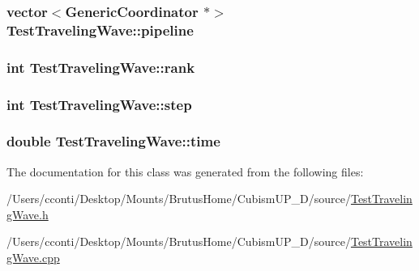 \subsubsection[{pipeline}]{\setlength{\rightskip}{0pt plus 5cm}vector$<${\bf Generic\+Coordinator} $\ast$$>$ Test\+Traveling\+Wave\+::pipeline\hspace{0.3cm}{\ttfamily [protected]}}\label{class_test_traveling_wave_a2bc69ad5f58d7c812ba12763d084e5e8}
\hypertarget{class_test_traveling_wave_a069c3d638156a0873797cdd07580e39a}{}
\subsubsection[{rank}]{\setlength{\rightskip}{0pt plus 5cm}int Test\+Traveling\+Wave\+::rank\hspace{0.3cm}{\ttfamily [protected]}}\label{class_test_traveling_wave_a069c3d638156a0873797cdd07580e39a}
\hypertarget{class_test_traveling_wave_ae91c33ae668592277f237a680d837dce}{}
\subsubsection[{step}]{\setlength{\rightskip}{0pt plus 5cm}int Test\+Traveling\+Wave\+::step\hspace{0.3cm}{\ttfamily [protected]}}\label{class_test_traveling_wave_ae91c33ae668592277f237a680d837dce}
\hypertarget{class_test_traveling_wave_ad7688dbdad3bc045057f63600965cd95}{}
\subsubsection[{time}]{\setlength{\rightskip}{0pt plus 5cm}double Test\+Traveling\+Wave\+::time\hspace{0.3cm}{\ttfamily [protected]}}\label{class_test_traveling_wave_ad7688dbdad3bc045057f63600965cd95}


The documentation for this class was generated from the following files\+:\begin{DoxyCompactItemize}
\item 
/\+Users/cconti/\+Desktop/\+Mounts/\+Brutus\+Home/\+Cubism\+U\+P\+\_\+D/source/\hyperlink{_test_traveling_wave_8h}{Test\+Traveling\+Wave.\+h}\item 
/\+Users/cconti/\+Desktop/\+Mounts/\+Brutus\+Home/\+Cubism\+U\+P\+\_\+D/source/\hyperlink{_test_traveling_wave_8cpp}{Test\+Traveling\+Wave.\+cpp}\end{DoxyCompactItemize}

